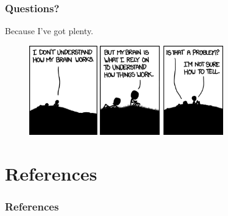 \documentclass[hyperref={hidelinks}]{beamer}
\begin{document}
\begin{frame}
  \frametitle{Questions?}
  Because I've got plenty.
  \begin{figure}
    \centering
    \includegraphics[width=0.75\textwidth]{figure/xkcd}
  \end{figure}
\end{frame}

\section{References}
\begin{frame}[allowframebreaks]
  \frametitle{References}
  \printbibliography
\end{frame}
\end{document}
